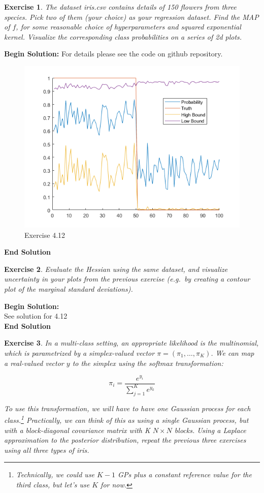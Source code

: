 \documentclass[twoside]{article}
\newcounter{lecnum}
\newtheorem{exercise}{Exercise}[lecnum]
\begin{document}
 \begin{exercise}
   The dataset iris.csv contains details of 150 flowers from three species. Pick two of them (your choice) as your regression dataset. Find the MAP of $f$, for some reasonable choice of hyperparameters and squared exponential kernel. Visualize the corresponding class probabilities on a series of 2d plots.
 \end{exercise}
\textbf{Begin Solution:}
For details please see the code on github repository.
\begin{figure}[H]
\begin{center}
\includegraphics[width=\textwidth]{./Exercise4_12/Probplot.png}
\end{center}
\caption{Exercise 4.12}
\end{figure}
\textbf{End Solution}
 \begin{exercise}
   Evaluate the Hessian using the same dataset, and visualize uncertainty in your plots from the previous exercise (e.g.\ by creating a contour plot of the marginal standard deviations).
   \end{exercise}
\textbf{Begin Solution:}
\\See solution for 4.12\\
\textbf{End Solution}

 \begin{exercise}
   In a multi-class setting, an appropriate likelihood is the multinomial, which is parametrized by a simplex-valued vector $\pi = (\pi_1,\dots, \pi_K)$. We can map a real-valued vector $y$ to the simplex using the softmax transformation:

   $$\pi_i = \frac{e^{y_i}}{\sum_{j=1}^K e^{y_k}}$$

   To use this transformation, we will have to have one Gaussian process for each class.\footnote{Technically, we could use $K-1$ GPs plus a constant reference value for the third class, but let's use $K$ for now.} Practically, we can think of this as using a single Gaussian process, but with a block-diagonal covariance matrix with K $N\times N$ blocks. Using a Laplace approximation to the posterior distribution, repeat the previous three exercises using all three types of iris.
   \end{exercise}
   
\end{document}
